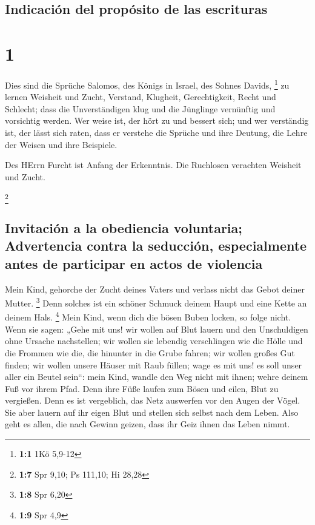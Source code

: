 \hypertarget{indicaciuxf3n-del-propuxf3sito-de-las-escrituras}{%
\subsection{Indicación del propósito de las
escrituras}\label{indicaciuxf3n-del-propuxf3sito-de-las-escrituras}}

\hypertarget{section}{%
\section{1}\label{section}}

 Dies sind die Sprüche Salomos, des Königs in Israel, des
Sohnes Davids, \footnote{\textbf{1:1} 1Kö 5,9-12}  zu
lernen Weisheit und Zucht, Verstand,  Klugheit,
Gerechtigkeit, Recht und Schlecht;  dass die
Unverständigen klug und die Jünglinge vernünftig und vorsichtig werden.
 Wer weise ist, der hört zu und bessert sich; und wer
verständig ist, der lässt sich raten,  dass er verstehe
die Sprüche und ihre Deutung, die Lehre der Weisen und ihre Beispiele.

 Des HErrn Furcht ist Anfang der Erkenntnis. Die Ruchlosen
verachten Weisheit und Zucht.

\footnote{\textbf{1:7} Spr 9,10; Ps 111,10; Hi 28,28}

\hypertarget{invitaciuxf3n-a-la-obediencia-voluntaria-advertencia-contra-la-seducciuxf3n-especialmente-antes-de-participar-en-actos-de-violencia}{%
\subsection{Invitación a la obediencia voluntaria; Advertencia contra la
seducción, especialmente antes de participar en actos de
violencia}\label{invitaciuxf3n-a-la-obediencia-voluntaria-advertencia-contra-la-seducciuxf3n-especialmente-antes-de-participar-en-actos-de-violencia}}

 Mein Kind, gehorche der Zucht deines Vaters und verlass
nicht das Gebot deiner Mutter. \footnote{\textbf{1:8} Spr 6,20}
 Denn solches ist ein schöner Schmuck deinem Haupt und
eine Kette an deinem Hals. \footnote{\textbf{1:9} Spr 4,9}
 Mein Kind, wenn dich die bösen Buben locken, so folge
nicht.  Wenn sie sagen: „Gehe mit uns! wir wollen auf
Blut lauern und den Unschuldigen ohne Ursache nachstellen;
 wir wollen sie lebendig verschlingen wie die Hölle und
die Frommen wie die, die hinunter in die Grube fahren; 
wir wollen großes Gut finden; wir wollen unsere Häuser mit Raub füllen;
 wage es mit uns! es soll unser aller ein Beutel sein``:
 mein Kind, wandle den Weg nicht mit ihnen; wehre deinem
Fuß vor ihrem Pfad.  Denn ihre Füße laufen zum Bösen und
eilen, Blut zu vergießen.  Denn es ist vergeblich, das
Netz auswerfen vor den Augen der Vögel.  Sie aber lauern
auf ihr eigen Blut und stellen sich selbst nach dem Leben.
 Also geht es allen, die nach Gewinn geizen, dass ihr
Geiz ihnen das Leben nimmt.

